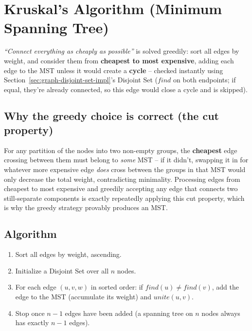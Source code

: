 \section{Kruskal's Algorithm (Minimum Spanning Tree)}
\label{sec:graph-kruskal}


\begin{patternbox}
\emph{``Connect everything as cheaply as possible''} is solved
greedily: sort all edges by weight, and consider them from
\textbf{cheapest to most expensive}, adding each edge to the MST
unless it would create a \textbf{cycle} -- checked instantly using
Section~\ref{sec:graph-disjoint-set-impl}'s Disjoint Set
($\textit{find}$ on both endpoints; if equal, they're already
connected, so this edge would close a cycle and is skipped).
\end{patternbox}

\subsection*{Why the greedy choice is correct (the cut property)}

For any partition of the nodes into two non-empty groups, the
\textbf{cheapest} edge crossing between them must belong to \emph{some}
MST -- if it didn't, swapping it in for whatever more expensive edge
\emph{does} cross between the groups in that MST would only decrease
the total weight, contradicting minimality. Processing edges from
cheapest to most expensive and greedily accepting any edge that
connects two still-separate components is exactly repeatedly applying
this cut property, which is why the greedy strategy provably produces
an MST.

\subsection*{Algorithm}

\begin{enumerate}
  \item Sort all edges by weight, ascending.
  \item Initialize a Disjoint Set over all $n$ nodes.
  \item For each edge $(u,v,w)$ in sorted order: if $\textit{find}(u)
        \neq \textit{find}(v)$, add the edge to the MST (accumulate
        its weight) and $\textit{unite}(u,v)$.
  \item Stop once $n{-}1$ edges have been added (a spanning tree on
        $n$ nodes always has exactly $n{-}1$ edges).
\end{enumerate}

